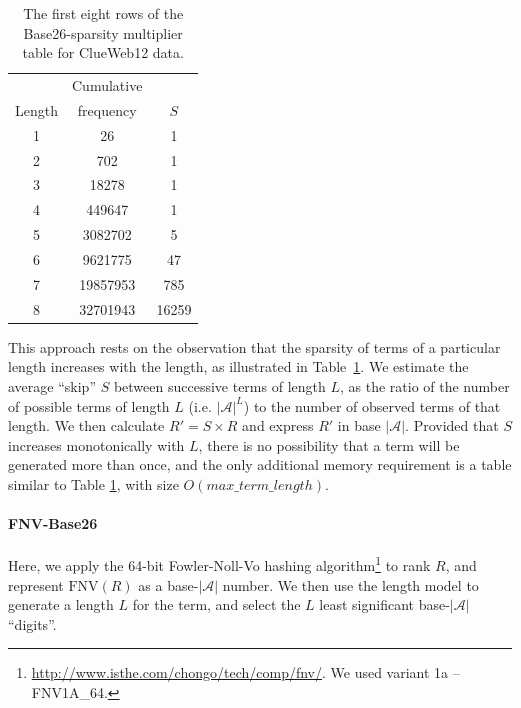 \documentclass[11pt]{report}
\newcommand{\Z}{\hphantom{0}}
\newcommand{\ZZ}{\hphantom{00}}
\newcommand{\ZZZ}{\hphantom{000}}
\newcommand{\ZZZZ}{\hphantom{0000}}
\newcommand{\ZZZZZ}{\hphantom{00000}}
\newcommand{\ZZZZZZ}{\hphantom{000000}}
\begin{document}
\begin{table}
\centering
\caption{The first eight rows of the Base26-sparsity multiplier table for ClueWeb12 data. \label{Sparsity}}
\begin{tabular}{ccc}
       & Cumulative \\
Length & frequency & $S$\\
\midrule
1 & \ZZZZZZ26 &\ZZZZ1\\
2 & \ZZZZZ702 &\ZZZZ1\\
3 & \ZZZ18278  &\ZZZZ1\\
4 & \ZZ449647 &\ZZZZ1\\
5 & \Z3082702 & \ZZZZ5\\
6 & \Z9621775 & \ZZZ47\\
7 & 19857953 & \ZZ785\\
8 & 32701943 & 16259\\
\bottomrule
\end{tabular}
\end{table}

This approach rests on the
observation that the sparsity of terms of a particular length
increases with the length, as illustrated in Table~\ref{Sparsity}.  
We estimate the average ``skip'' $S$
between successive terms of length $L$, as the ratio of the
number of possible terms of length $L$ (i.e. $|\mathcal{A}|^L$) to the
number of observed terms of that length.  We then calculate 
$R' = S \times R$ and express $R'$ in base $|\mathcal{A}|$.  Provided
that $S$ increases monotonically with $L$, there is no possibility 
that a term will be generated more than once, and the only additional memory
requirement is a table similar to Table \ref{Sparsity}, with size $O(max\_term\_length)$.

\paragraph*{FNV-Base26}

Here, we apply the 64-bit Fowler-Noll-Vo hashing
algorithm\footnote{\url{http://www.isthe.com/chongo/tech/comp/fnv/}. We
used variant 1a -- FNV1A\_64.} to rank $R$, and represent
$\mathrm{FNV}(R)$ as a base-$|\mathcal{A}|$ number.  We then use the
length model to generate a length $L$ for the term, and select the $L$
least significant base-$|\mathcal{A}|$ ``digits''.  
\end{document}

